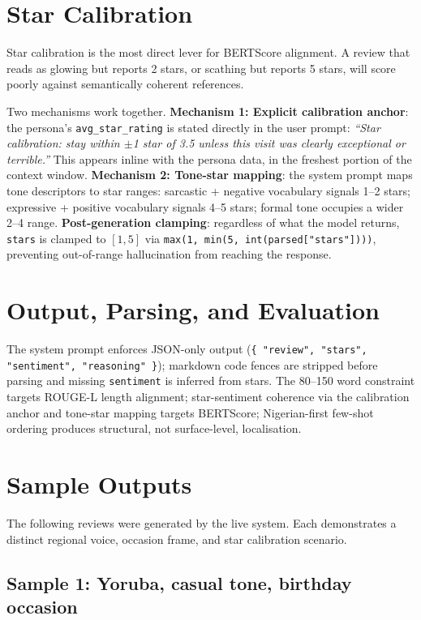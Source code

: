 \documentclass[11pt]{article}
\begin{document}
\section{Star Calibration}

Star calibration is the most direct lever for BERTScore alignment. A review that reads as glowing but reports 2 stars, or scathing but reports 5 stars, will score poorly against semantically coherent references.

Two mechanisms work together. \textbf{Mechanism 1: Explicit calibration anchor}: the persona's \texttt{avg\_star\_rating} is stated directly in the user prompt: \textit{``Star calibration: stay within $\pm$1 star of 3.5 unless this visit was clearly exceptional or terrible.''} This appears inline with the persona data, in the freshest portion of the context window. \textbf{Mechanism 2: Tone-star mapping}: the system prompt maps tone descriptors to star ranges: sarcastic + negative vocabulary signals 1–2 stars; expressive + positive vocabulary signals 4–5 stars; formal tone occupies a wider 2–4 range. \textbf{Post-generation clamping}: regardless of what the model returns, \texttt{stars} is clamped to $[1,5]$ via \texttt{max(1, min(5, int(parsed["stars"])))}, preventing out-of-range hallucination from reaching the response.

\section{Output, Parsing, and Evaluation}

The system prompt enforces JSON-only output (\texttt{\{ "review", "stars", "sentiment", "reasoning" \}}); markdown code fences are stripped before parsing and missing \texttt{sentiment} is inferred from stars. The 80--150 word constraint targets ROUGE-L length alignment; star-sentiment coherence via the calibration anchor and tone-star mapping targets BERTScore; Nigerian-first few-shot ordering produces structural, not surface-level, localisation.

\section{Sample Outputs}

The following reviews were generated by the live system. Each demonstrates a distinct regional voice, occasion frame, and star calibration scenario.

\subsection*{Sample 1: Yoruba, casual tone, birthday occasion}
\end{document}
